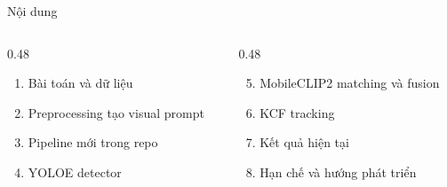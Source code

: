 \documentclass[aspectratio=169]{beamer}
\newcommand{\tightitem}{\setlength\itemsep{0.42em}}
\begin{document}
\begin{frame}{Nội dung}
  \begin{columns}[T,onlytextwidth]
    \begin{column}{0.48\textwidth}
      \begin{enumerate}
        \tightitem
        \item Bài toán và dữ liệu
        \item Preprocessing tạo visual prompt
        \item Pipeline mới trong repo
        \item YOLOE detector
      \end{enumerate}
    \end{column}
    \begin{column}{0.48\textwidth}
      \begin{enumerate}
        \setcounter{enumi}{4}
        \tightitem
        \item MobileCLIP2 matching và fusion
        \item KCF tracking
        \item Kết quả hiện tại
        \item Hạn chế và hướng phát triển
      \end{enumerate}
    \end{column}
  \end{columns}
\end{frame}
\end{document}

